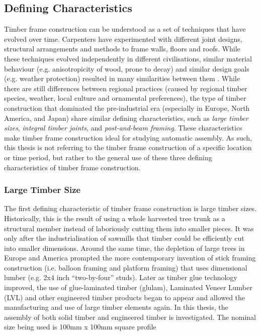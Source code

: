 \subsection{Defining Characteristics}
\label{subsection:introduction-defining-characteristics}

Timber frame construction can be understood as a set of techniques that have evolved over time. Carpenters have experimented with different joint designs, structural arrangements and methods to frame walls, floors and roofs. While these techniques evolved independently in different civilisations, similar material behaviour (e.g. anisotropicity of wood, prone to decay) and similar design goals (e.g. weather protection) resulted in many similarities between them \parencite{zwergerWoodWoodJoints2012}.
While there are still differences between regional practices (caused by regional timber species, weather, local culture and ornamental preferences), the type of timber construction that dominated the pre-industrial era (especially in Europe, North America, and Japan) share similar defining characteristics, such as \textit{large timber sizes}, \textit{integral timber joints}, and \textit{post-and-beam framing}. 
These characteristics make timber frame construction ideal for studying automatic assembly.
As such, this thesis is not referring to the timber frame construction of a specific location or time period, but rather to the general use of these three defining characteristics of timber frame construction.

\subsubsection{Large Timber Size}
\label{subsubsection:introduction-large-timber-size}

The first defining characteristic of timber frame construction is large timber sizes.
Historically, this is the result of using a whole harvested tree trunk as a structural member instead of laboriously cutting them into smaller pieces.
It was only after the industrialisation of sawmills that timber could be efficiently cut into smaller dimensions.
Around the same time, the depletion of large trees in Europe and America prompted the more contemporary invention of stick framing construction (i.e. balloon framing and platform framing) that uses dimensional lumber (e.g. 2x4 inch “two-by-four” studs). Later as timber glue technology improved, the use of glue-laminated timber (glulam), Laminated Veneer Lumber (LVL) and other engineered timber products began to appear and allowed the manufacturing and use of large timber elements again.
In this thesis, the assembly of both solid timber and engineered timber is investigated.
The nominal size being used is 100mm x 100mm square profile 

